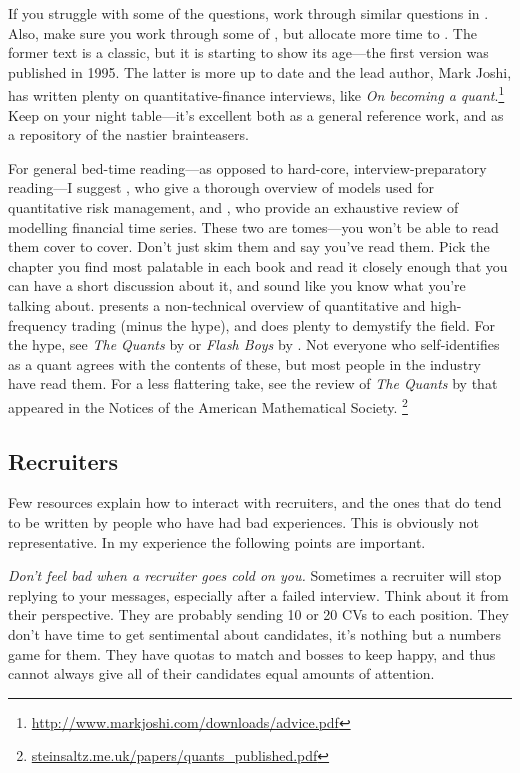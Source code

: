 \documentclass[a4paper]{article}
\begin{document}
If you struggle with some of the questions, work through similar questions in \citep{JoshiQA}.
Also, make sure you work through some of \citet{HeardOnTheStreet}, but allocate more time to \citet{JoshiQA}.
The former text is a classic, but it is starting to show its age---the first version was published in 1995.
The latter is more up to date and the lead author, Mark Joshi, has written plenty on quantitative-finance interviews, like
\emph{On becoming a quant}.\footnote{\url{http://www.markjoshi.com/downloads/advice.pdf}}
Keep \citet{WilmottFAQ} on your night table---it's excellent both as a general reference work, and as a repository of the nastier brainteasers.

For general bed-time reading---as opposed to hard-core, interview-preparatory reading---I suggest
\citet{mcneil2015quantitative}, who give a thorough overview of models used for quantitative risk management, and
\citet{andersen2009handbook}, who provide an exhaustive review of modelling financial time series.
These two are tomes---you won't be able to read them cover to cover.
Don't just skim them and say you've read them.
Pick the chapter you find most palatable in each book and read it
closely enough that you can have a short discussion about it, and sound like you know what you're talking about.
\citet{narang2013inside} presents a non-technical overview of quantitative and high-frequency trading (minus the hype), and does plenty to demystify the field.
For the hype, see
\emph{The Quants} by \citet{patterson2010quants}
or
\emph{Flash Boys} by \citet{lewis2014flash}.
Not everyone who self-identifies as a quant agrees with the contents of these, but most people in the industry have read them.
For a less flattering take, see the review of \emph{The Quants} by \citet{steinsaltz2011value} that appeared in the Notices of the American Mathematical Society.%
\footnote{\url{steinsaltz.me.uk/papers/quants_published.pdf}}

{}
\subsection*{Recruiters}
Few resources explain how to interact with recruiters, and the ones that do tend to be written by people who have had bad experiences.
This is obviously not representative.
In my experience the following points are important.

\emph{Don't feel bad when a recruiter goes cold on you.}
Sometimes a recruiter will stop replying to your messages, especially after a failed interview.
Think about it from their perspective.
They are probably sending 10 or 20 CVs to each position.
They don't have time to get sentimental about candidates, it's nothing but a numbers game for them.
They have quotas to match and bosses to keep happy, and thus cannot always give all of their candidates equal amounts of attention.
\end{document}
